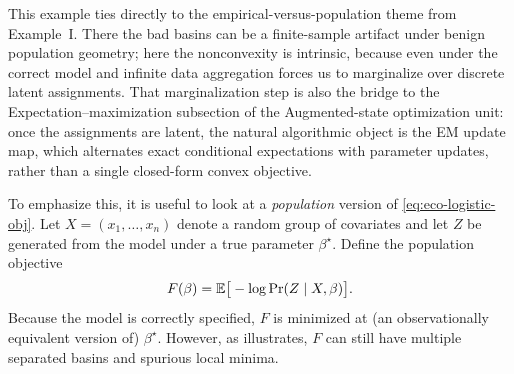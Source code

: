 \documentclass[11pt]{article}
\newif\ifshowsolutions
\newcommand{\SolutionBox}[2][10]{%
  \ifshowsolutions
    \begin{tcolorbox}[stat221panelgray,title={Solution}]
    #2
    \end{tcolorbox}
  \else
    \begin{tcolorbox}[stat221panelgray,unbreakable,title={Workspace}]
    \vspace{#1\baselineskip}
    \end{tcolorbox}
  \fi
}
\begin{document}
\SolutionBox[14]{%
\emph{Part (1).}
If $x_{g,i}\equiv x_g$, then conditional on $x_g$ the unit-level outcomes are i.i.d.\ Bernoulli with success probability $\sigma(x_g^\top\beta)$.
Therefore $Z_g=\sum_{i=1}^{n_g}Y_{g,i}\sim \mathrm{Binomial}(n_g,\sigma(x_g^\top\beta))$.
Up to an additive constant (independent of $\beta$), the per-group negative log-likelihood can be written as a function of the scalar $\eta=x_g^\top\beta$:
\[
\ell_g(\beta)
= -z_g\,\eta + n_g\log(1+e^\eta).
\]
Since $\frac{d^2}{d\eta^2}\ell_g(\eta)=n_g\,\sigma'(\eta)\ge 0$, the map $\eta\mapsto \ell_g(\eta)$ is convex.
Composing a convex function with a linear map $\beta\mapsto x_g^\top\beta$ preserves convexity, so $\ell_g$ is convex in $\beta$.
Summing over $g$ preserves convexity, hence the full objective is convex.

\emph{Part (2).}
Write $p_i(\beta_0,\beta_1)=\sigma(\beta_0+\beta_1 x_i)$.
Replacing $\beta_1$ by $-\beta_1$ replaces $p_i$ by $\tilde p_i=\sigma(\beta_0-\beta_1 x_i)$.
By the assumed symmetry of the multiset $\{x_i\}$, the multiset $\{\tilde p_i\}$ is the same as $\{p_i\}$ up to a permutation (each $x$ is paired with $-x$).
But the distribution of $Z=\sum_i Y_i$ depends only on the multiset of success probabilities, not on how they are ordered, so $\Pr(Z=z\mid x_1,\dots,x_n,(\beta_0,\beta_1))=\Pr(Z=z\mid x_1,\dots,x_n,(\beta_0,-\beta_1))$ for every $z$.
Thus the likelihood is an even function of $\beta_1$, which means the sign of the slope is not identifiable from totals in this balanced design.%
}

This example ties directly to the empirical-versus-population theme from Example~I.
There the bad basins can be a finite-sample artifact under benign population geometry; here the nonconvexity is intrinsic, because even under the correct model and infinite data aggregation forces us to marginalize over discrete latent assignments.
That marginalization step is also the bridge to the Expectation--maximization subsection of the Augmented-state optimization unit: once the assignments are latent, the natural algorithmic object is the EM update map, which alternates exact conditional expectations with parameter updates, rather than a single closed-form convex objective.

To emphasize this, it is useful to look at a \emph{population} version of \eqref{eq:eco-logistic-obj}.
Let $X=(x_1,\dots,x_n)$ denote a random group of covariates and let $Z$ be generated from the model under a true parameter $\beta^\star$.
Define the population objective
\[
F(\beta)=\mathbb{E}\big[-\log \Pr(Z\mid X,\beta)\big].
\]
Because the model is correctly specified, $F$ is minimized at (an observationally equivalent version of) $\beta^\star$.
However, as  illustrates, $F$ can still have multiple separated basins and spurious local minima.
\end{document}
